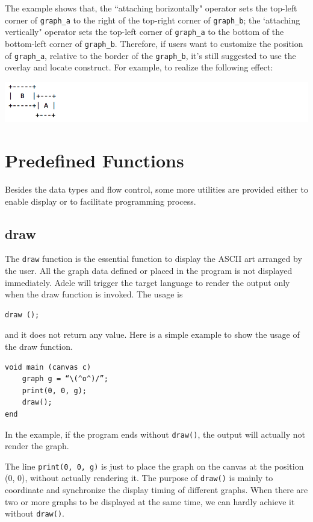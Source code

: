 \documentclass[11pt,letterpaper]{article}
\begin{document}
The example shows that, the ``attaching horizontally" operator sets the top-left corner of \texttt{graph\_a} to the right of the top-right corner of \texttt{graph\_b}; the `attaching vertically" operator sets the top-left corner of \texttt{graph\_a} to the bottom of the bottom-left corner of \texttt{graph\_b}. Therefore, if users want to customize the position of \texttt{graph\_a}, relative to the border of the \texttt{graph\_b}, it's still suggested to use the overlay and locate construct. For example, to realize the following effect:

\includegraphics[width=\textwidth]{./graph_03.png}

\section {Predefined Functions}

Besides the data types and flow control, some more utilities are provided either to enable display or to facilitate programming process.

\subsection {draw}
The \texttt{draw} function is the essential function to display the ASCII art arranged by the user. All the graph data defined or placed in the program is not displayed immediately. Adele will trigger the target language to render the output only when the draw function is invoked. The usage is
\begin{lstlisting}[tabsize=4] 
	draw (); 
\end{lstlisting}
and it does not return any value. Here is a simple example to show the usage of the draw function.
\pagebreak
\begin{lstlisting}[tabsize=4, frame=single]
void main (canvas c)
	graph g = “\(^o^)/”;
	print(0, 0, g);
	draw();
end
\end{lstlisting}

In the example, if the program ends without \texttt{draw()}, the output will actually not render the graph.

The line \texttt{print(0, 0, g)} is just to place the graph on the canvas at the position (0, 0), without actually rendering it. The purpose of \texttt{draw()} is mainly to coordinate and synchronize the display timing of different graphs. When there are two or more graphs to be displayed at the same time, we can hardly achieve it without \texttt{draw()}. 
\end{document}
